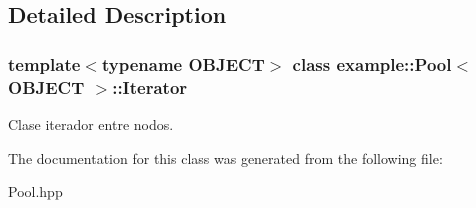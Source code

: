 \subsection{Detailed Description}
\subsubsection*{template$<$typename O\+B\+J\+E\+CT$>$\newline
class example\+::\+Pool$<$ O\+B\+J\+E\+C\+T $>$\+::\+Iterator}

Clase iterador entre nodos. 



The documentation for this class was generated from the following file\+:\begin{DoxyCompactItemize}
\item 
Pool.\+hpp\end{DoxyCompactItemize}
